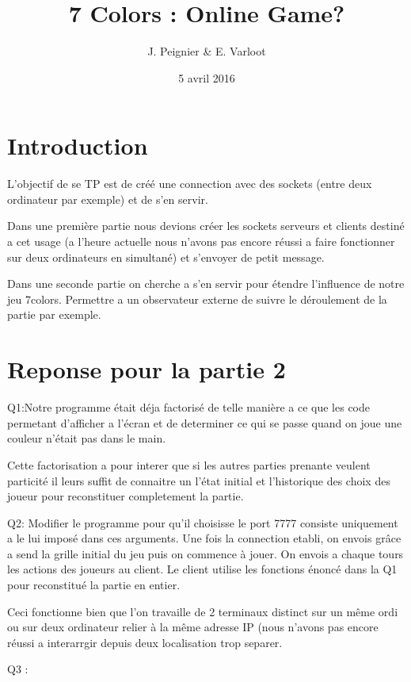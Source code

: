 \documentclass[a4paper]{article}
\title{7 Colors : Online Game?}
\author{J. Peignier \& E. Varloot}
\date{5 avril 2016}
\begin{document}
\maketitle{}

\pagebreak{}
	
\section{Introduction}
L'objectif de se TP est de créé une connection avec des sockets (entre deux ordinateur par exemple) et de s'en servir. 

Dans une première partie nous devions créer les sockets serveurs et clients destiné a cet usage (a l'heure actuelle nous n'avons pas encore réussi a faire fonctionner sur deux ordinateurs en simultané) et  s'envoyer de petit message.

Dans une seconde partie on cherche a s'en servir pour étendre l'influence de notre jeu 7colors. Permettre a un observateur externe de suivre le déroulement de la partie par exemple.

\section{Reponse pour la partie 2}
 
Q1:Notre programme était déja factorisé de telle manière a ce que les code permetant d'afficher a l'écran et de determiner ce qui se passe quand on joue une couleur n'était pas dans le main. 
 
Cette factorisation a pour interer que si les autres parties prenante veulent particité il leurs suffit de connaitre un l'état initial et l'historique des choix des joueur pour reconstituer completement la partie.
\bigskip

Q2: Modifier le programme pour qu'il choisisse le port 7777 consiste uniquement a le lui imposé dans ces arguments.
Une fois la connection etabli, on envois grâce a send la grille initial du jeu puis on commence à jouer. On envois a chaque tours les actions des joueurs au client.
Le client utilise les fonctions énoncé dans la Q1 pour reconstitué la partie en entier.

Ceci fonctionne bien que l'on travaille de 2 terminaux distinct sur un même ordi ou sur deux ordinateur relier à la même adresse IP (nous n'avons pas encore réussi a interarrgir depuis deux localisation trop separer.

\bigskip

Q3 :
\bigskip
\end{document}
